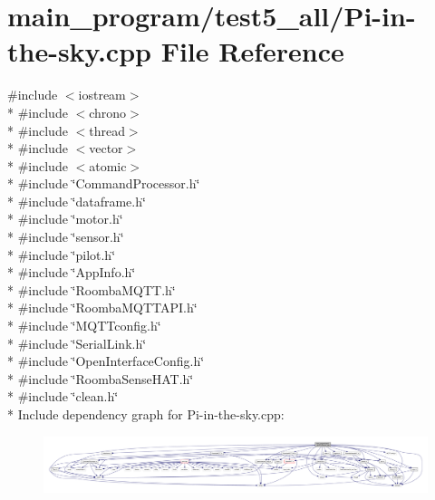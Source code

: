 \hypertarget{test5__all_2_pi-in-the-sky_8cpp}{}\section{main\+\_\+program/test5\+\_\+all/\+Pi-\/in-\/the-\/sky.cpp File Reference}
\label{test5__all_2_pi-in-the-sky_8cpp}
{\ttfamily \#include $<$iostream$>$}\\*
{\ttfamily \#include $<$chrono$>$}\\*
{\ttfamily \#include $<$thread$>$}\\*
{\ttfamily \#include $<$vector$>$}\\*
{\ttfamily \#include $<$atomic$>$}\\*
{\ttfamily \#include \char`\"{}Command\+Processor.\+h\char`\"{}}\\*
{\ttfamily \#include \char`\"{}dataframe.\+h\char`\"{}}\\*
{\ttfamily \#include \char`\"{}motor.\+h\char`\"{}}\\*
{\ttfamily \#include \char`\"{}sensor.\+h\char`\"{}}\\*
{\ttfamily \#include \char`\"{}pilot.\+h\char`\"{}}\\*
{\ttfamily \#include \char`\"{}App\+Info.\+h\char`\"{}}\\*
{\ttfamily \#include \char`\"{}Roomba\+M\+Q\+T\+T.\+h\char`\"{}}\\*
{\ttfamily \#include \char`\"{}Roomba\+M\+Q\+T\+T\+A\+P\+I.\+h\char`\"{}}\\*
{\ttfamily \#include \char`\"{}M\+Q\+T\+Tconfig.\+h\char`\"{}}\\*
{\ttfamily \#include \char`\"{}Serial\+Link.\+h\char`\"{}}\\*
{\ttfamily \#include \char`\"{}Open\+Interface\+Config.\+h\char`\"{}}\\*
{\ttfamily \#include \char`\"{}Roomba\+Sense\+H\+A\+T.\+h\char`\"{}}\\*
{\ttfamily \#include \char`\"{}clean.\+h\char`\"{}}\\*
Include dependency graph for Pi-\/in-\/the-\/sky.cpp\+:
\nopagebreak
\begin{figure}[H]
\begin{center}
\leavevmode
\includegraphics[width=350pt]{test5__all_2_pi-in-the-sky_8cpp__incl}
\end{center}
\end{figure}
